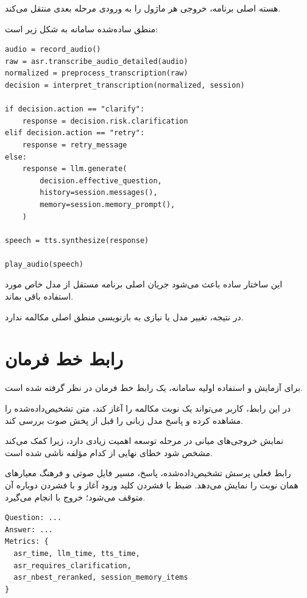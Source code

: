 هسته اصلی برنامه، خروجی هر ماژول را به ورودی مرحله بعدی
منتقل می‌کند.

منطق ساده‌شده سامانه به شکل زیر است:

\begin{latin}\begin{verbatim}
audio = record_audio()
raw = asr.transcribe_audio_detailed(audio)
normalized = preprocess_transcription(raw)
decision = interpret_transcription(normalized, session)

if decision.action == "clarify":
    response = decision.risk.clarification
elif decision.action == "retry":
    response = retry_message
else:
    response = llm.generate(
        decision.effective_question,
        history=session.messages(),
        memory=session.memory_prompt(),
    )

speech = tts.synthesize(response)

play_audio(speech)
\end{verbatim}\end{latin}

این ساختار ساده باعث می‌شود جریان اصلی برنامه مستقل از مدل
خاص مورد استفاده باقی بماند.

در نتیجه، تغییر مدل  یا  نیازی به بازنویسی منطق اصلی
مکالمه ندارد.


\section{رابط خط فرمان}

برای آزمایش و استفاده اولیه سامانه، یک رابط خط فرمان
در نظر گرفته شده است.

در این رابط، کاربر می‌تواند یک نوبت مکالمه را آغاز کند،
متن تشخیص‌داده‌شده را مشاهده کرده و پاسخ مدل زبانی را قبل
از پخش صوت بررسی کند.

نمایش خروجی‌های میانی در مرحله توسعه اهمیت زیادی دارد، زیرا
کمک می‌کند مشخص شود خطای نهایی از کدام مؤلفه ناشی شده است.

رابط فعلی پرسش تشخیص‌داده‌شده، پاسخ، مسیر فایل صوتی و فرهنگ
معیارهای همان نوبت را نمایش می‌دهد. ضبط با فشردن کلید ورود آغاز
و با فشردن دوباره آن متوقف می‌شود؛ خروج با  انجام
می‌گیرد.

\begin{latin}\begin{verbatim}
Question: ...
Answer: ...
Metrics: {
  asr_time, llm_time, tts_time,
  asr_requires_clarification,
  asr_nbest_reranked, session_memory_items
}
\end{verbatim}\end{latin}

